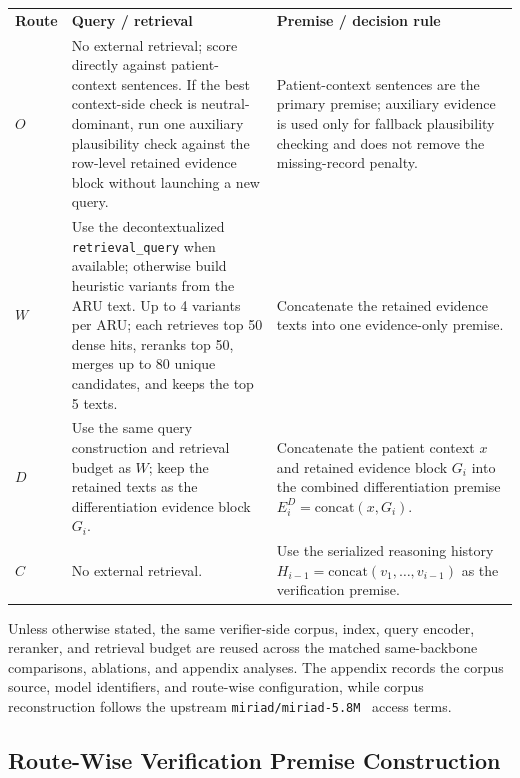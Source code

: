 \documentclass[a4paper,fleqn,doubleblind]{cas-sc}
\begin{document}
\begin{table}[htbp]
{    \begin{tabular}{>{\centering\arraybackslash}p{}>{\raggedright\arraybackslash}p{}>{\raggedright\arraybackslash}p{}}
        \toprule
        \multicolumn{3}{l}{\textbf{Panel B: Route-wise premise policy}} \\
        \midrule
        \textbf{Route} & \textbf{Query / retrieval} & \textbf{Premise / decision rule} \\
        \midrule
        $O$ & No external retrieval; score directly against patient-context sentences. If the best context-side check is neutral-dominant, run one auxiliary plausibility check against the row-level retained evidence block without launching a new query. & Patient-context sentences are the primary premise; auxiliary evidence is used only for fallback plausibility checking and does not remove the missing-record penalty. \\
        \midrule
        $W$ & Use the decontextualized \texttt{retrieval\_query} when available; otherwise build heuristic variants from the ARU text. Up to 4 variants per ARU; each retrieves top 50 dense hits, reranks top 50, merges up to 80 unique candidates, and keeps the top 5 texts. & Concatenate the retained evidence texts into one evidence-only premise. \\
        \midrule
        $D$ & Use the same query construction and retrieval budget as $W$; keep the retained texts as the differentiation evidence block $G_i$. & Concatenate the patient context $x$ and retained evidence block $G_i$ into the combined differentiation premise $E_i^{D} = \mathrm{concat}(x, G_i)$. \\
        \midrule
        $C$ & No external retrieval. & Use the serialized reasoning history $H_{i-1} = \mathrm{concat}(v_1, \dots, v_{i-1})$ as the verification premise. \\
        \bottomrule
    \end{tabular}}
\end{table}

Unless otherwise stated, the same verifier-side corpus, index, query encoder, reranker, and retrieval budget are reused across the matched same-backbone comparisons, ablations, and appendix analyses. The appendix records the corpus source, model identifiers, and route-wise configuration, while corpus reconstruction follows the upstream \texttt{miriad/miriad-5.8M}~\cite{zheng2025miriad} access terms.

\subsection{Route-Wise Verification Premise Construction}
\end{document}
